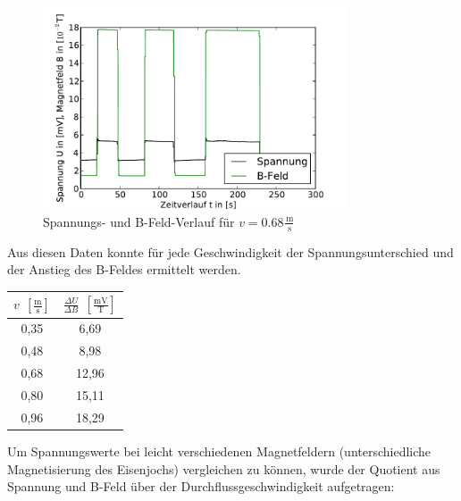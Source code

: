 \documentclass[11pt]{scrartcl}
\newcommand{\unit}[1]{\ensuremath{\,\mathrm{#1}}} %
\begin{document}

\begin{figure}[H]
\begin{center}
\includegraphics[width=0.8\textwidth]{images/U-B-068.pdf}
\end{center}
\vspace{-1.5\baselineskip}
\caption{Spannungs- und B-Feld-Verlauf für $v=0.68\frac{\unit{m}}{\unit{s}}$}
\label{U-B-068}
\end{figure}

Aus diesen Daten konnte für jede Geschwindigkeit der Spannungsunterschied und der Anstieg des B-Feldes ermittelt werden. 

\begin{table}[ht]
\label{Geschwindigkeitstabelle}
\begin{center}\vspace{-\baselineskip}
\begin{tabular}{c|c}
$v\; \unit{[\frac{m}{s}]}$ &
$\frac{\Delta U}{\Delta B}\; \unit{[\frac{mV}{T}]}$ \\
\hline
0,35	& 6,69 \\
0,48	& 8,98 \\
0,68	& 12,96 \\
0,80	& 15,11 \\
0,96	& 18,29
\end{tabular}
\vspace{-\baselineskip}\end{center}
\end{table}

Um Spannungswerte bei leicht verschiedenen Magnetfeldern (unterschiedliche Magnetisierung des Eisenjochs) vergleichen zu können, wurde der Quotient aus Spannung und B-Feld über der Durchflussgeschwindigkeit aufgetragen:
\end{document}
